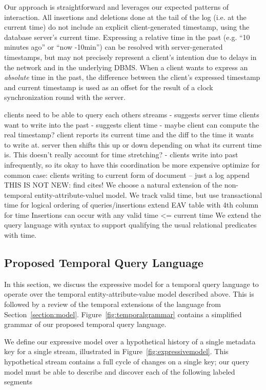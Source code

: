 Our approach is straightforward and leverages our expected patterns of interaction.
All insertions and deletions done at the tail of the log (i.e. at the current time)
do not include an explicit client-generated timestamp, using the database server's current
time. Expressing a relative time in the past (e.g. ``10 minutes ago'' or ``now -10min'')
can be resolved with server-generated timestamps, but may not precisely represent
a client's intention due to delays in the network and in the underlying DBMS.
When a client wants to express an \emph{absolute} time in the past, the difference
between the client's expressed timestamp and current timestamp is used as an offset
for the result of a clock synchronization round with the server.

clients need to be able to query each others streams
    - suggests server time
clients want to write into the past
    - suggests client time
    - maybe client can compute the real timestamp?
        client reports its current time and the diff to the time it wants to write at.
        server then shifts this up or down depending on what its current time is.
        This doesn't really account for time stretching?
    - clients write into past infrequently, so its okay to have this coordination be more expensive
optimize for common case: clients writing to current form of document -- just a log append
\fi
{}
THIS IS NOT NEW: find cites!
We choose a natural extension of the non-temporal entity-attribute-valuel model.
We track valid time, but use transactional time for logical ordering of queries/insertions
extend EAV table with 4th column for time
Insertions can occur with any valid time <= current time
We extend the query language with syntax to support qualifying the usual
relational predicates with time.
\fi

\subsection{Proposed Temporal Query Language}

In this section, we discuss the expressive model for a temporal query language to operate
over the temporal entity-attribute-value model described above. This is followed by a review
of the temporal extensions of the language from Section~\ref{section:model}.
Figure~\ref{fig:temporalgrammar} contains a simplified grammar of our proposed temporal query language.

We define our expressive model over a hypothetical history of a single metadata key for a single stream, illustrated
in Figure~\ref{fig:expressivemodel}. This hypothetical stream contains a full cycle of changes on a single key; our query
model must be able to describe and discover each of the following labeled segments

